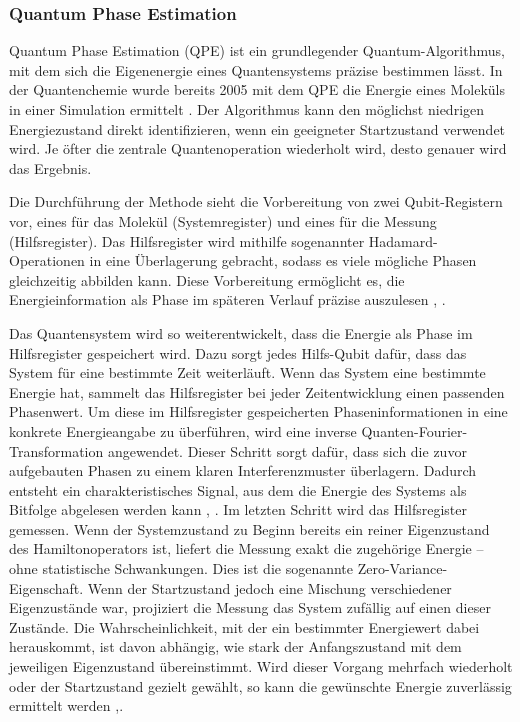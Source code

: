 \subsubsection*{Quantum Phase Estimation}

Quantum Phase Estimation (QPE) ist ein grundlegender Quantum-Algorithmus, mit dem sich die Eigenenergie eines Quantensystems präzise bestimmen lässt. In der Quantenchemie wurde bereits 2005 mit dem QPE die Energie eines Moleküls in einer Simulation ermittelt \citealp[5]{weidmanQuantumComputingChemistry2024a}. Der Algorithmus kann den möglichst niedrigen Energiezustand direkt identifizieren, wenn ein geeigneter Startzustand verwendet wird. Je öfter die zentrale Quantenoperation wiederholt wird, desto genauer wird das Ergebnis.

Die Durchführung der Methode sieht die Vorbereitung von zwei Qubit-Registern vor, eines für das Molekül (Systemregister) und eines für die Messung (Hilfsregister). Das Hilfsregister wird mithilfe sogenannter Hadamard-Operationen in eine Überlagerung gebracht, sodass es viele mögliche Phasen gleichzeitig abbilden kann. Diese Vorbereitung ermöglicht es, die Energieinformation als Phase im späteren Verlauf präzise auszulesen \citealp[25]{weidmanQuantumComputingChemistry2024a}, \citealp[29]{mottaEmergingQuantumComputing2022}. 

Das Quantensystem wird so weiterentwickelt, dass die Energie als Phase im Hilfsregister gespeichert wird. Dazu sorgt jedes Hilfs-Qubit dafür, dass das System für eine bestimmte Zeit weiterläuft. Wenn das System eine bestimmte Energie hat, sammelt das Hilfsregister bei jeder Zeitentwicklung einen passenden Phasenwert. Um diese im Hilfsregister gespeicherten Phaseninformationen in eine konkrete Energieangabe zu überführen, wird eine inverse Quanten-Fourier-Transformation angewendet. Dieser Schritt sorgt dafür, dass sich die zuvor aufgebauten Phasen zu einem klaren Interferenzmuster überlagern. Dadurch entsteht ein charakteristisches Signal, aus dem die Energie des Systems als Bitfolge abgelesen werden kann \citealp[7]{vonburgQuantumComputingEnhanced2021}, \citealp[25]{mottaEmergingQuantumComputing2022}. Im letzten Schritt wird das Hilfsregister gemessen. Wenn der Systemzustand zu Beginn bereits ein reiner Eigenzustand des Hamiltonoperators ist, liefert die Messung exakt die zugehörige Energie – ohne statistische Schwankungen. Dies ist die sogenannte Zero-Variance-Eigenschaft. Wenn der Startzustand jedoch eine Mischung verschiedener Eigenzustände war, projiziert die Messung das System zufällig auf einen dieser Zustände. Die Wahrscheinlichkeit, mit der ein bestimmter Energiewert dabei herauskommt, ist davon abhängig, wie stark der Anfangszustand mit dem jeweiligen Eigenzustand übereinstimmt. Wird dieser Vorgang mehrfach wiederholt oder der Startzustand gezielt gewählt, so kann die gewünschte Energie zuverlässig ermittelt werden \citealp[7]{vonburgQuantumComputingEnhanced2021},\citealp[25]{mottaEmergingQuantumComputing2022}.


